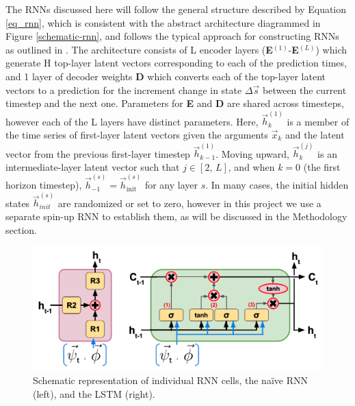 The RNNs discussed here will follow the general structure described by Equation \ref{eq_rnn}, which is consistent with the abstract architecture diagrammed in Figure \ref{schematic-rnn}, and follows the typical approach for constructing RNNs as outlined in \parencite{russell_artificial_2020}. The architecture consists of L encoder layers (\textbf{E}$^{(1)}$-\textbf{E}$^{(L)}$) which generate H top-layer latent vectors corresponding to each of the prediction times, and 1 layer of decoder weights \textbf{D} which converts each of the top-layer latent vectors to a prediction for the increment change in state $\Delta \vec{s}$ between the current timestep and the next one. Parameters for \textbf{E} and \textbf{D} are shared across timesteps, however each of the L layers have distinct parameters. Here, $\vec{h}_k^{(1)}$ is a member of the time series of first-layer latent vectors given the arguments $\vec{x}_k$ and the latent vector from the previous first-layer timestep $\vec{h}_{k-1}^{(1)}$. Moving upward, $\vec{h}_k^{(j)}$ is an intermediate-layer latent vector such that $j \in [2,\,L]$, and when $k=0$ (the first horizon timestep), $\vec{h}^{(s)}_{-1} = \vec{h}^{(s)}_{\text{init}}$ for any layer $s$. In many cases, the initial hidden states $\vec{h}^{(s)}_{init}$ are randomized or set to zero, however in this project we use a separate spin-up RNN to establish them, as will be discussed in the Methodology section.

\begin{figure}[h!]
    \centering

    \includegraphics[width=.95\linewidth]{figures/schematic_rnns-both.png}

    \caption{Schematic representation of individual RNN cells, the na\"ive RNN (left), and the LSTM (right).}
    \label{rnns-both}
\end{figure}

